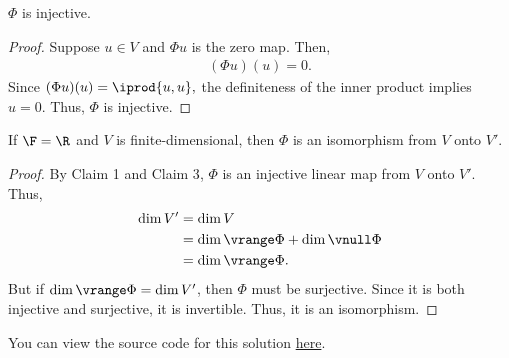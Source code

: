 \documentclass{amsart}
\newcommand{\pagenum}{190}
\newcommand{\probnum}{17}
\begin{document}
\vspace{0.5in}

\begin{claim}
 $\Phi$ is injective.
\end{claim}
\begin{proof}
Suppose $u\in V$ and $\Phi u$ is the zero map. Then,
\begin{align*}
    (\Phi u)(u) = 0.
\end{align*}
Since $(\Phi u)(u)=\iprod{u,u},$ the definiteness of the inner
product implies $u=0.$
Thus, $\Phi$ is injective.
\end{proof}

\vspace{0.5in}

\begin{claim}
    If $\F=\R$ and $V$ is finite-dimensional, then
    $\Phi$ is an isomorphism from $V$ onto $V'.$
\end{claim}
\begin{proof}
By \textsf{Claim 1} and \textsf{Claim 3},
$\Phi$ is an injective linear map from $V$ onto $V'.$ Thus,
\begin{align*}
    \dim V' &= \dim V \\
            &= \dim\vrange\Phi+\dim\vnull\Phi \\
            &= \dim\vrange\Phi.
\end{align*}
But if $\dim\vrange\Phi=\dim V'$, then  $\Phi$ must be surjective.
Since it is both injective and surjective, it is invertible.
Thus, it is an isomorphism.
\end{proof}

\vspace{0.5in}


\begin{note*}
You can view the source code for this solution
\href{https://github.com/thomasbreydo/linalg/blob/main/\pagenum_\probnum_Thomas_Breydo.tex}
{here}.
\end{note*}
\end{document}

